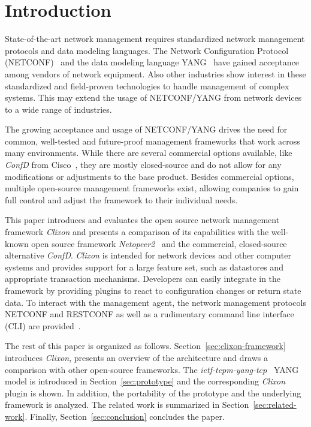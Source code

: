 \section{Introduction}
\label{sec:introduction}

State-of-the-art network management requires standardized network management protocols and data modeling languages. The Network Configuration Protocol (NETCONF)~\cite{RFC6241} and the data modeling language YANG~\cite {RFC7950} have gained acceptance among vendors of network equipment. Also other industries show interest in these standardized and field-proven technologies to handle management of complex systems. This may extend the usage of NETCONF/YANG from network devices to a wide range of industries.

The growing acceptance and usage of NETCONF/YANG drives the need for common, well-tested and future-proof management frameworks that work across many environments. While there are several commercial options available, like \textit{ConfD} from Cisco~\cite{confd}, they are mostly closed-source and do not allow for any modifications or adjustments to the base product. Besides commercial options, multiple open-source management frameworks exist, allowing companies to gain full control and adjust the framework to their individual needs.

This paper introduces and evaluates the open source network management framework \textit{Clixon} and presents a comparison of its capabilities with the well-known open source framework \textit{Netopeer2}~\cite{netopeer2} and the commercial, closed-source alternative \textit{ConfD}. \textit{Clixon} is intended for network devices and other computer systems and provides support for a large feature set, such as datastores and appropriate transaction mechanisms. Developers can easily integrate in the framework by providing plugins to react to configuration changes or return state data. To interact with the management agent, the network management protocols NETCONF and RESTCONF as well as a rudimentary command line interface (CLI) are provided~\cite{clixon-documentation}.

The rest of this paper is organized as follows. Section~\ref{sec:clixon-framework} introduces \textit{Clixon}, presents an overview of the architecture and draws a comparison with other open-source frameworks. The \textit{ietf-tcpm-yang-tcp}~\cite{draft-ietf-tcpm-yang-tcp} YANG model is introduced in Section~\ref{sec:prototype} and the corresponding \textit{Clixon} plugin is shown. In addition, the portability of the prototype and the underlying framework is analyzed. The related work is summarized in Section~\ref{sec:related-work}. Finally, Section~\ref{sec:conclusion} concludes the paper.